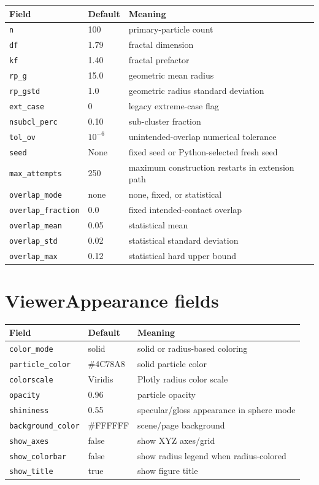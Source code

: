 \documentclass[11pt,oneside]{report}
\newcommand{\code}[1]{\texttt{#1}}
\begin{document}
\begin{longtable}{p{}p{}p{}}
\toprule
Field & Default & Meaning \\
\midrule
\endhead
\code{n} & 100 & primary-particle count \\
\code{df} & 1.79 & fractal dimension \\
\code{kf} & 1.40 & fractal prefactor \\
\code{rp\_g} & 15.0 & geometric mean radius \\
\code{rp\_gstd} & 1.0 & geometric radius standard deviation \\
\code{ext\_case} & 0 & legacy extreme-case flag \\
\code{nsubcl\_perc} & 0.10 & sub-cluster fraction \\
\code{tol\_ov} & \(10^{-6}\) & unintended-overlap numerical tolerance \\
\code{seed} & None & fixed seed or Python-selected fresh seed \\
\code{max\_attempts} & 250 & maximum construction restarts in extension path \\
\code{overlap\_mode} & none & none, fixed, or statistical \\
\code{overlap\_fraction} & 0.0 & fixed intended-contact overlap \\
\code{overlap\_mean} & 0.05 & statistical mean \\
\code{overlap\_std} & 0.02 & statistical standard deviation \\
\code{overlap\_max} & 0.12 & statistical hard upper bound \\
\bottomrule
\end{longtable}

\section{ViewerAppearance fields}

\begin{longtable}{p{}p{}p{}}
\toprule
Field & Default & Meaning \\
\midrule
\code{color\_mode} & solid & solid or radius-based coloring \\
\code{particle\_color} & \#4C78A8 & solid particle color \\
\code{colorscale} & Viridis & Plotly radius color scale \\
\code{opacity} & 0.96 & particle opacity \\
\code{shininess} & 0.55 & specular/gloss appearance in sphere mode \\
\code{background\_color} & \#FFFFFF & scene/page background \\
\code{show\_axes} & false & show XYZ axes/grid \\
\code{show\_colorbar} & false & show radius legend when radius-colored \\
\code{show\_title} & true & show figure title \\
\bottomrule
\end{longtable}
\end{document}
